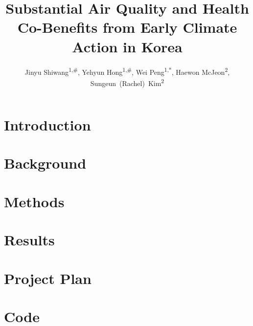 \documentclass[12pt]{setup/puthesis_undergraduate}
\title{Substantial Air Quality and Health Co-Benefits from Early Climate Action in Korea}
\author{Jinyu Shiwang\textsuperscript{1,\#}, Yehyun Hong\textsuperscript{1,\#}, Wei Peng\textsuperscript{1,*}, Haewon McJeon\textsuperscript{2}, Sungeun~(Rachel)~Kim\textsuperscript{2}}
\begin{document}
\chapter{Introduction}\label{ch:intro}


\chapter{Background}\label{ch:background}


\chapter{Methods}\label{ch:methods}


\chapter{Results}\label{ch:results}


\appendix
\chapter{Project Plan}\label{app:plan}


\chapter{Code}\label{app:code}


% 
% 
\end{document}
